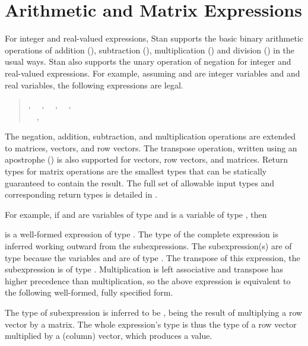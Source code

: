 \section{Arithmetic and Matrix Expressions}\label{arithmetic-expressions.section}

For integer and real-valued expressions, Stan supports the basic
binary arithmetic operations of addition (\code{+}), subtraction
(\code{-}), multiplication (\code{*}) and division (\code{/}) in the
usual ways.  
Stan also supports the unary operation of negation for
integer and real-valued expressions.  For example, assuming 
and  are integer variables and  and  real
variables, the following expressions are legal.
%
\begin{quote}
, 
\ \ ,
\ \ , 
\ \ ,
\\
\ \ ,
\ \ 
\end{quote}
%
The negation, addition, subtraction, and multiplication operations are
extended to matrices, vectors, and row vectors.  The transpose
operation, written using an apostrophe () is also supported
for vectors, row vectors, and matrices.  Return types for matrix
operations are the smallest types that can be statically guaranteed to
contain the result.  The full set of allowable input types and
corresponding return types is detailed in
.

For example, if  and  are variables of type
 and  is a variable of type ,
then
%
\begin{quote}
\end{quote}
%
is a well-formed expression of type .  The type of the
complete expression is inferred working outward from the
subexpressions.  The subexpression(s)  are of type
 because the variables  and  are of type
.  The transpose of this expression, the subexpression
 is of type .  Multiplication is
left associative and transpose has higher precedence than
multiplication, so the above expression is equivalent to the following
well-formed, fully specified form.
%
\begin{quote}
\end{quote}
%
The type of subexpression  is inferred to be
, being the result of multiplying a row vector by a
matrix.  The whole expression's type is thus the type of a row vector
multiplied by a (column) vector, which produces a  value.

